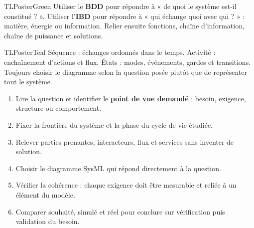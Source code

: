\documentclass[10pt,a3paper]{article}
\begin{document}
\begin{minipage}[t]{0.49\linewidth}
\begin{TLPosterBloc}{TLPosterGreen}
Utiliser le \textbf{BDD} pour répondre à « de quoi le système est-il constitué ? ». Utiliser l'\textbf{IBD} pour répondre à « qui échange quoi avec qui ? » : matière, énergie ou information. Relier ensuite fonctions, chaîne d'information, chaîne de puissance et solutions.
\end{TLPosterBloc}
\begin{TLPosterBloc}{TLPosterTeal}
Séquence : échanges ordonnés dans le temps. Activité : enchaînement d'actions et flux. États : modes, événements, gardes et transitions. Toujours choisir le diagramme selon la question posée plutôt que de représenter tout le système.
\end{TLPosterBloc}
\end{minipage}
\vfill
\begin{TLPosterMethode}
\begin{enumerate}
  \item Lire la question et identifier le \textbf{point de vue demandé} : besoin, exigence, structure ou comportement.
  \item Fixer la frontière du système et la phase du cycle de vie étudiée.
  \item Relever parties prenantes, interacteurs, flux et services sans inventer de solution.
  \item Choisir le diagramme SysML qui répond directement à la question.
  \item Vérifier la cohérence : chaque exigence doit être mesurable et reliée à un élément du modèle.
  \item Comparer souhaité, simulé et réel pour conclure sur vérification puis validation du besoin.
\end{enumerate}
\end{TLPosterMethode}
\vfill
{}
\end{document}
